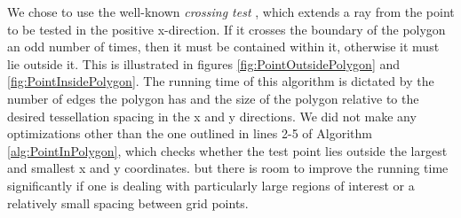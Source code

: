
We chose to use the well-known \textit{crossing test} \cite{Shimrat1962Algorithms}, which extends a ray from the point to be tested in the positive x-direction. If it crosses the boundary of the polygon an odd number of times, then it must be contained within it, otherwise it must lie outside it. This is illustrated in figures \ref{fig:PointOutsidePolygon} and \ref{fig:PointInsidePolygon}. The running time of this algorithm is dictated by the number of edges the polygon has and the size of the polygon relative to the desired tessellation spacing in the x and y directions. We did not make any optimizations other than the one outlined in lines 2-5 of Algorithm \ref{alg:PointInPolygon}, which checks whether the test point lies outside the largest and smallest x and y coordinates. but there is room to improve the running time significantly if one is dealing with particularly large regions of interest or a relatively small spacing between grid points.


\begin{figure}{}
\hspace{1em}
\end{figure}


